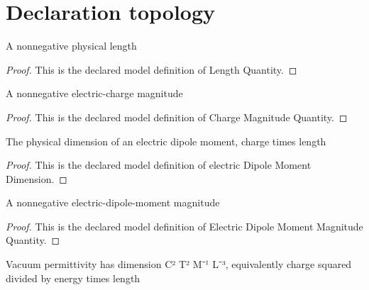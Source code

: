 \section{Declaration topology}
\begin{definition}
  \label{def:physics:phyx-mini-0522:phyxminiproblems-problemphyxmini0522-lengthquantity}
  A nonnegative physical length
\end{definition}
\begin{proof}
  This is the declared model definition of Length Quantity.
\end{proof}
\begin{definition}
  \label{def:physics:phyx-mini-0522:phyxminiproblems-problemphyxmini0522-chargemagnitudequantity}
  A nonnegative electric-charge magnitude
\end{definition}
\begin{proof}
  This is the declared model definition of Charge Magnitude Quantity.
\end{proof}
\begin{definition}
  \label{def:physics:phyx-mini-0522:phyxminiproblems-problemphyxmini0522-electricdipolemomentdimension}
  The physical dimension of an electric dipole moment, charge times length
\end{definition}
\begin{proof}
  This is the declared model definition of electric Dipole Moment Dimension.
\end{proof}
\begin{definition}
  \label{def:physics:phyx-mini-0522:phyxminiproblems-problemphyxmini0522-electricdipolemomentmagnitudequantity}
  A nonnegative electric-dipole-moment magnitude
\end{definition}
\begin{proof}
  This is the declared model definition of Electric Dipole Moment Magnitude Quantity.
\end{proof}
\begin{definition}
  \label{def:physics:phyx-mini-0522:phyxminiproblems-problemphyxmini0522-vacuumpermittivitydimension}
  Vacuum permittivity has dimension C² T² M⁻¹ L⁻³, equivalently charge squared divided by energy times length
\end{definition}
